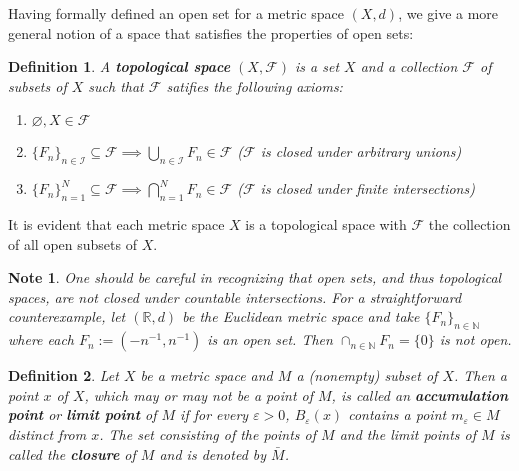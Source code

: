 \documentclass[11pt]{article}
\theoremstyle{mystyle}
\newtheorem{defn}{Definition}[section]
\newtheorem{note}{Note}[section]
\newcommand{\0}{\mathbf{0}}
\begin{document}
Having formally defined an open set for a metric space $(X, d)$, we give a more general notion of a space that satisfies the properties of open sets:
\begin{defn}
A \textbf{topological space} $(X, \mathscr{F})$ is a set $X$ and a collection $\mathscr{F}$ of subsets of $X$ such that $\mathscr{F}$ satifies the following axioms:
\begin{enumerate}
    \item $\varnothing, X \in \mathscr{F}$ 
    \item $\{F_n\}_{n \in \mathcal{I}} \subseteq \mathscr{F} \implies \bigcup_{n \in \mathcal{I}} F_n \in \mathscr{F}$ \quad ($\mathscr{F}$ is closed under arbitrary unions)
    \item $\{F_n\}_{n=1}^N \subseteq \mathscr{F} \implies \bigcap_{n=1}^N F_n \in \mathscr{F}$ \quad ($\mathscr{F}$ is closed under finite intersections)
\end{enumerate}
\end{defn}

It is evident that each metric space $X$ is a topological space with $\mathscr{F}$ the collection of all open subsets of $X$.

\begin{note}
One should be careful in recognizing that open sets, and thus topological spaces, \textit{are not closed under countable intersections}. For a straightforward counterexample, let $(\mathbb{R}, d)$ be the Euclidean metric space and take $\{F_n \}_{n \in \mathbb{N}}$ where each $F_n := (-n^{-1}, n^{-1})$ is an open set. Then $\cap_{n \in \mathbb{N}} F_n = \{ 0 \}$ is not open.
\end{note}

\begin{defn}
Let $X$ be a metric space and $M$ a (nonempty) subset of $X$. Then a point $x$ of $X$, which may or may not be a point of $M$, is called an \textbf{accumulation point} or \textbf{limit point} of $M$ if for every $\varepsilon > 0$, $B_{\varepsilon}(x)$ contains a point $m_{\varepsilon}\in M$ distinct from $x$. The set consisting of the points of $M$ and the limit points of $M$ is called the \textbf{closure} of $M$ and is denoted by $\bar{M}$.
\end{defn}
\end{document}
